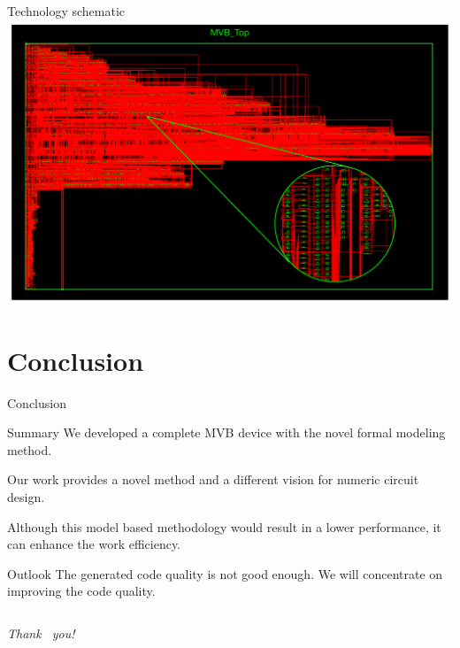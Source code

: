 \documentclass[12pt,beamer]{beamer}
\begin{document}
\begin{frame}{Technology schematic}
	\includegraphics[width=\textwidth]{pic/TechnologySchematic.pdf}
\end{frame}




\section{Conclusion}
\begin{frame}{Conclusion}

\begin{block}{Summary}
We developed a complete MVB device with the novel formal modeling method. 

Our work provides a novel method and a different vision for numeric circuit design. 

Although this model based methodology would result in a lower performance, it can enhance the work efficiency.

\end{block}

\begin{block}{Outlook}
The generated code quality is not good enough.
We will concentrate on improving the code quality. 
\end{block}

\end{frame}

\begin{frame}[c]
	\centering
	\begin{columns}
			{\huge \emph{{Thank  ~you!}}}\\
	\end{columns}
\end{frame}
\end{document}
